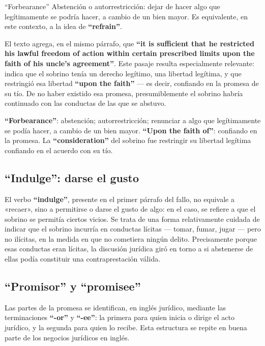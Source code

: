 \documentclass[12pt,oneside]{book}
\begin{document}
\begin{definition}{``Forbearance''}
Abstención o autorrestricción: dejar de hacer algo que legítimamente se podría hacer, a cambio de un bien mayor. Es equivalente, en este contexto, a la idea de \textbf{``refrain''}.
\end{definition}

El texto agrega, en el mismo párrafo, que \textbf{``it is sufficient that he restricted his lawful freedom of action within certain prescribed limits upon the faith of his uncle's agreement''}. Este pasaje resulta especialmente relevante: indica que el sobrino tenía un derecho legítimo, una libertad legítima, y que restringió esa libertad \textbf{``upon the faith''} --- es decir, confiando en la promesa de su tío. De no haber existido esa promesa, presumiblemente el sobrino habría continuado con las conductas de las que se abstuvo.

\begin{note}
\textbf{``Forbearance''}: abstención; autorrestricción; renunciar a algo que legítimamente se podía hacer, a cambio de un bien mayor. \textbf{``Upon the faith of''}: confiando en la promesa. La \textbf{``consideration''} del sobrino fue restringir su libertad legítima confiando en el acuerdo con su tío.
\end{note}

\subsection{\texorpdfstring{``Indulge'': darse el gusto}{Indulge: darse el gusto}}

El verbo \textbf{``indulge''}, presente en el primer párrafo del fallo, no equivale a «recaer», sino a permitirse o darse el gusto de algo: en el caso, se refiere a que el sobrino se permitía ciertos vicios. Se trata de una forma relativamente cuidada de indicar que el sobrino incurría en conductas lícitas --- tomar, fumar, jugar --- pero no ilícitas, en la medida en que no cometiera ningún delito. Precisamente porque esas conductas eran lícitas, la discusión jurídica giró en torno a si abstenerse de ellas podía constituir una contraprestación válida.

\subsection{\texorpdfstring{``Promisor'' y ``promisee''}{Promisor y promisee}}

Las partes de la promesa se identifican, en inglés jurídico, mediante las terminaciones \textbf{``-or''} y \textbf{``-ee''}: la primera para quien inicia o dirige el acto jurídico, y la segunda para quien lo recibe. Esta estructura se repite en buena parte de los negocios jurídicos en inglés.
\end{document}
